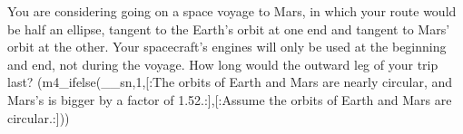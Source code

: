 You are considering going on a space voyage to Mars, in
        which your route would be half an ellipse, tangent to the
        Earth's orbit at one end and tangent to Mars' orbit at the
        other. Your spacecraft's engines will only be used at the
        beginning and end, not during the voyage. How long would the
        outward leg of your trip last? (m4_ifelse(__sn,1,[:The orbits of Earth and Mars are nearly circular, and Mars's is bigger by a factor of 1.52.:],[:Assume the orbits of Earth
        and Mars are circular.:])) \answercheck
